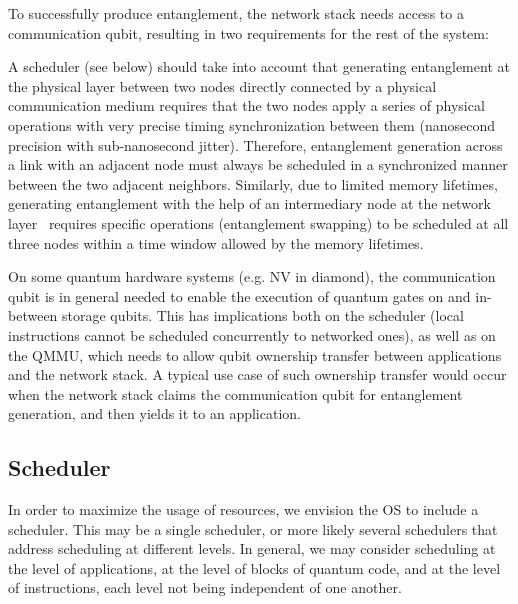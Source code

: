 To successfully produce entanglement, the network stack needs access to a communication qubit,
resulting in two requirements for the rest of the system:
\begin{enumerate*}[label=(\arabic*)]
    \item A scheduler (see below) should take into account that generating entanglement at the
          physical layer between two nodes directly connected by a physical communication medium
          requires that the two nodes apply a series of physical operations with very precise timing
          synchronization between them (nanosecond precision with sub-nanosecond jitter). Therefore,
          entanglement generation across a link with an adjacent node must always be scheduled in a
          synchronized manner between the two adjacent neighbors. Similarly, due to limited memory
          lifetimes, generating entanglement with the help of an intermediary node at the network
          layer~\cite{kozlowski_2020_qnp} requires specific operations (entanglement swapping) to be
          scheduled at all three nodes within a time window allowed by the memory lifetimes.
    \item On some quantum hardware systems (e.g. NV in diamond), the communication qubit is in
          general needed to enable the execution of quantum gates on and in-between storage qubits.
          This has implications both on the scheduler (local instructions cannot be scheduled
          concurrently to networked ones), as well as on the QMMU, which needs to allow qubit
          ownership transfer between applications and the network stack. A typical use case of such
          ownership transfer would occur when the network stack claims the communication qubit for
          entanglement generation, and then yields it to an application.
\end{enumerate*}

\subsection{Scheduler}

In order to maximize the usage of resources, we envision the OS to include a scheduler. This may be
a single scheduler, or more likely several schedulers that address scheduling at different levels.
In general, we may consider scheduling at the level of applications, at the level of blocks of
quantum code, and at the level of instructions, each level not being independent of one another.

